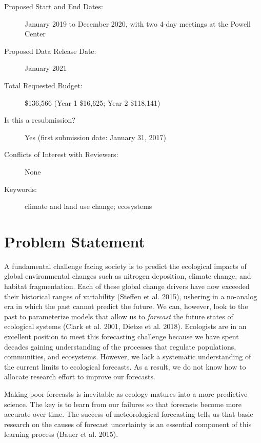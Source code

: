 \documentclass[12pt,]{article}
\begin{document}
\begin{description}
\item[Proposed Start and End Dates:] January 2019 to December 2020, with two 4-day meetings at the Powell Center
\item[Proposed Data Release Date:] January 2021
\item[Total Requested Budget:] \$136,566 (Year 1 \$16,625; Year 2 \$118,141)
\item[Is this a resubmission?] Yes (first submission date: January 31, 2017)
\item[Conflicts of Interest with Reviewers:] None
\item[Keywords:] climate and land use change; ecosystems
\end{description}

\newpage{}


\section{Problem Statement}

A fundamental challenge facing society is to predict the ecological
impacts of global environmental changes such as nitrogen deposition,
climate change, and habitat fragmentation. Each of these global change
drivers have now exceeded their historical ranges of variability
(Steffen et al. 2015), ushering in a no-analog era in which the past
cannot predict the future. We can, however, look to the past to
parameterize models that allow us to \emph{forecast} the future states
of ecological systems (Clark et al. 2001, Dietze et al. 2018).
Ecologists are in an excellent position to meet this forecasting
challenge because we have spent decades gaining understanding of the
processes that regulate populations, communities, and ecosystems.
However, we lack a systematic understanding of the current limits to
ecological forecasts. As a result, we do not know how to allocate
research effort to improve our forecasts.

Making poor forecasts is inevitable as ecology matures into a more
predictive science. The key is to learn from our failures so that
forecasts become more accurate over time. The success of meteorological
forecasting tells us that basic research on the causes of forecast
uncertainty is an essential component of this learning process (Bauer et
al. 2015).
\end{document}

